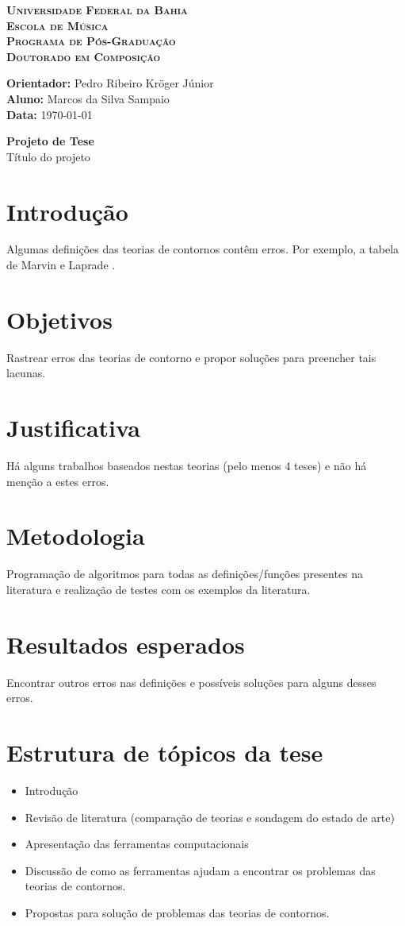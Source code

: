 \documentclass[12pt]{article}
\newcommand{\cabecalho}[0]{
  \textbf{\textsc{Universidade Federal da Bahia}} \\
  \textbf{\textsc{Escola de Música}} \\
  \textbf{\textsc{Programa de Pós-Graduação}} \\
  \textbf{\textsc{Doutorado em Composição}} \par
  \vspace*{1ex}
  \textbf{Orientador:} Pedro Ribeiro Kröger Júnior\\
  \textbf{Aluno: } Marcos da Silva Sampaio \\
  \textbf{Data: } \today
  \thispagestyle{empty}
}
\newcommand{\titulo}[1]{
  \vspace{1cm}
  \begin{center}{
      \Huge \textbf{Projeto de Tese} \\
    }
    \vspace{12pt}
    {\Large #1}
  \end{center}
  \vspace{1cm}
}
\begin{document}
\cabecalho
\titulo{Título do projeto}

\section{Introdução}
\label{sec:introducao}

Algumas definições das teorias de contornos contêm erros. Por exemplo,
a tabela de Marvin e Laprade \cite{marvin.ea87:relating}.

\section{Objetivos}
\label{sec:objetivos}

Rastrear erros das teorias de contorno e propor soluções para
preencher tais lacunas.

\section{Justificativa}
\label{sec:justificativa}

Há alguns trabalhos baseados nestas teorias (pelo menos 4 teses) e não
há menção a estes erros.

\section{Metodologia}
\label{sec:metodologia}

Programação de algoritmos para todas as definições/funções presentes
na literatura e realização de testes com os exemplos da literatura.

\section{Resultados esperados}
\label{sec:resultados-esperados}

Encontrar outros erros nas definições e possíveis soluções para alguns
desses erros.

\section{Estrutura de tópicos da tese}
\label{sec:estrutura-de-topicos}

\begin{itemize}
\item Introdução
\item Revisão de literatura (comparação de teorias e sondagem do
  estado de arte)
\item Apresentação das ferramentas computacionais
\item Discussão de como as ferramentas ajudam a encontrar os problemas
  das teorias de contornos.
\item Propostas para solução de problemas das teorias de contornos.
\end{itemize}
\end{document}
